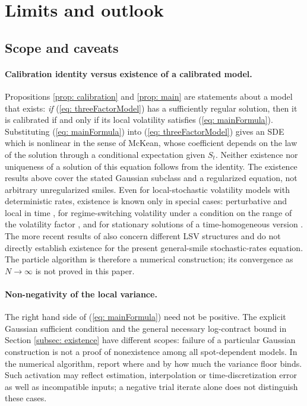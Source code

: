 \section{Limits and outlook}\label{sec: limits}
\subsection{Scope and caveats}\label{subsec: caveats}

\paragraph{Calibration identity versus existence of a calibrated model.} Propositions \ref{prop: calibration} and \ref{prop: main} are statements about a model that exists: \emph{if} (\ref{eq: threeFactorModel}) has a sufficiently regular solution, then it is calibrated if and only if its local volatility satisfies (\ref{eq: mainFormula}). Substituting (\ref{eq: mainFormula}) into (\ref{eq: threeFactorModel}) gives an SDE which is nonlinear in the sense of McKean, whose coefficient depends on the law of the solution through a conditional expectation given $S_t$. Neither existence nor uniqueness of a solution of this equation follows from the identity. The existence results above cover the stated Gaussian subclass and a regularized equation, not arbitrary unregularized smiles. Even for local-stochastic volatility models with deterministic rates, existence is known only in special cases: perturbative and local in time \cite{abergelTachet}, for regime-switching volatility under a condition on the range of the volatility factor \cite{jourdainZhou}, and for stationary solutions of a time-homogeneous version \cite{lackerShkolnikovZhang}. The more recent results of \cite{djete,mustapha} also concern different LSV structures and do not directly establish existence for the present general-smile stochastic-rates equation. The particle algorithm is therefore a numerical construction; its convergence as $N\to\infty$ is not proved in this paper.

\paragraph{Non-negativity of the local variance.}
The right hand side of (\ref{eq: mainFormula}) need not be positive.
The explicit Gaussian sufficient condition and the general necessary
log-contract bound in Section \ref{subsec: existence} have different scopes:
failure of a particular Gaussian construction is not a proof of nonexistence
among all spot-dependent models. In the numerical algorithm, report where
and by how much the variance floor binds. Such activation may reflect
estimation, interpolation or time-discretization error as well as incompatible
inputs; a negative trial iterate alone does not distinguish these cases.

